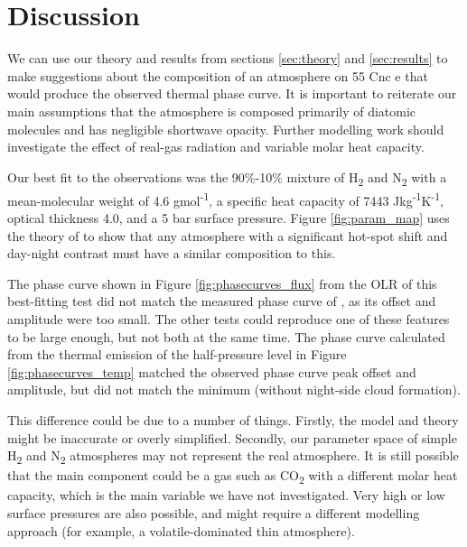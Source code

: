 


\section{Discussion}

We can use our theory and results from sections \ref{sec:theory} and \ref{sec:results} to make suggestions about the composition of an atmosphere on 55 Cnc e that would produce the observed thermal phase curve. It is important to reiterate our main assumptions that the atmosphere is composed primarily of diatomic molecules and has negligible shortwave opacity. Further modelling work should investigate the effect of real-gas radiation and variable molar heat capacity.

Our best fit to the observations was the 90\%-10\% mixture of H\textsubscript{2} and N\textsubscript{2} with a mean-molecular weight of 4.6 gmol\textsuperscript{-1}, a specific heat capacity of 7443 Jkg\textsuperscript{-1}K\textsuperscript{-1}, optical thickness 4.0, and a 5 bar surface pressure. Figure \ref{fig:param_map} uses the theory of \citet{zhang2016effects} to show that any atmosphere with a significant hot-spot shift and day-night contrast must have a similar composition to this.

The phase curve shown in Figure \ref{fig:phasecurves_flux} from the OLR of this best-fitting test did not match the measured phase curve of \citet{demory2016map}, as its offset and amplitude were too small. The other tests could reproduce one of these features to be large enough, but not both at the same time. The phase curve calculated from the thermal emission of the half-pressure level in Figure \ref{fig:phasecurves_temp} matched the observed phase curve peak offset and amplitude, but did not match the minimum (without night-side cloud formation).

This difference could be due to a number of things. Firstly, the model and theory might be inaccurate or overly simplified. Secondly, our parameter space of simple H\textsubscript{2} and N\textsubscript{2} atmospheres may not represent the real atmosphere. It is still possible that the main component could be a gas such as CO\textsubscript{2} with a different molar heat capacity, which is the main variable we have not investigated. Very high or low surface pressures are also possible, and might require a different modelling approach (for example, a volatile-dominated thin atmosphere).

